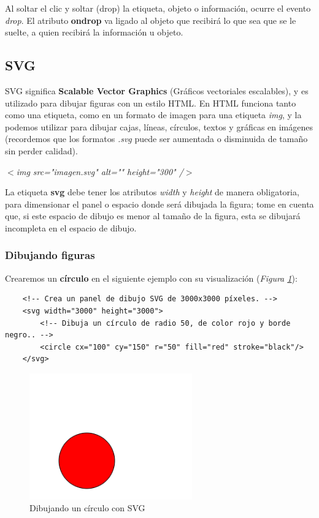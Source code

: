 Al soltar el clic y soltar (drop) la etiqueta, objeto o información, ocurre el evento \textit{drop}. El atributo \textbf{ondrop} va ligado al objeto que recibirá lo que sea que se le suelte, a quien recibirá la información u objeto.


\subsection{SVG}

SVG significa \textbf{Scalable Vector Graphics} (Gráficos vectoriales escalables), y es utilizado para dibujar figuras con un estilo HTML. En HTML funciona tanto como una etiqueta, como en un formato de imagen para una etiqueta \textit{img}, y la podemos utilizar para dibujar cajas, líneas, círculos, textos y gráficas en imágenes (recordemos que los formatos \textit{.svg} puede ser aumentada o disminuida de tamaño sin perder calidad).
\begin{center}
    \textit{$<$img src="imagen.svg" alt="" height="300" /$>$}
\end{center}

La etiqueta \textbf{svg} debe tener los atributos \textit{width} y \textit{height} de manera obligatoria, para dimensionar el panel o espacio donde será dibujada la figura; tome en cuenta que, si este espacio de dibujo es menor al tamaño de la figura, esta se dibujará incompleta en el espacio de dibujo.


\subsubsection{Dibujando figuras}

Crearemos un \textbf{círculo} en el siguiente ejemplo con su visualización (\textit{Figura \ref{fig: 20}}):
\begin{lstlisting}
    <!-- Crea un panel de dibujo SVG de 3000x3000 píxeles. -->
    <svg width="3000" height="3000">
        <!-- Dibuja un círculo de radio 50, de color rojo y borde negro.. -->
        <circle cx="100" cy="150" r="50" fill="red" stroke="black"/>
    </svg>
\end{lstlisting}
\begin{figure}[H]
    \centering
    \caption{Dibujando un círculo con SVG}
    \label{fig: 20}
    \includegraphics[width=7cm]{ss_html/svg_circle.png}
\end{figure}

